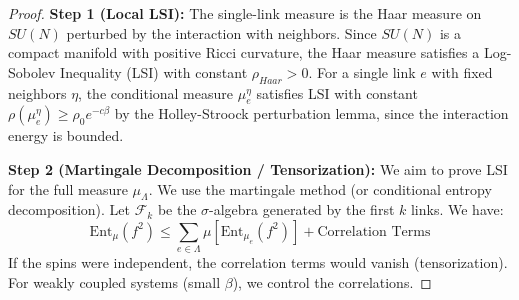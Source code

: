 \begin{proof}
\textbf{Step 1 (Local LSI):}
The single-link measure is the Haar measure on $SU(N)$ perturbed by the interaction with neighbors. Since $SU(N)$ is a compact manifold with positive Ricci curvature, the Haar measure satisfies a Log-Sobolev Inequality (LSI) with constant $\rho_{Haar} > 0$.
For a single link $e$ with fixed neighbors $\eta$, the conditional measure $\mu_e^\eta$ satisfies LSI with constant $\rho(\mu_e^\eta) \geq \rho_0 e^{-c\beta}$ by the Holley-Stroock perturbation lemma, since the interaction energy is bounded.

\textbf{Step 2 (Martingale Decomposition / Tensorization):}
We aim to prove LSI for the full measure $\mu_\Lambda$. We use the martingale method (or conditional entropy decomposition).
Let $\mathcal{F}_k$ be the $\sigma$-algebra generated by the first $k$ links. We have:
\begin{equation}
\mathrm{Ent}_\mu(f^2) \leq \sum_{e \in \Lambda} \mu[ \mathrm{Ent}_{\mu_e}(f^2) ] + \text{Correlation Terms}
\end{equation}
If the spins were independent, the correlation terms would vanish (tensorization). For weakly coupled systems (small $\beta$), we control the correlations.


\end{proof}
